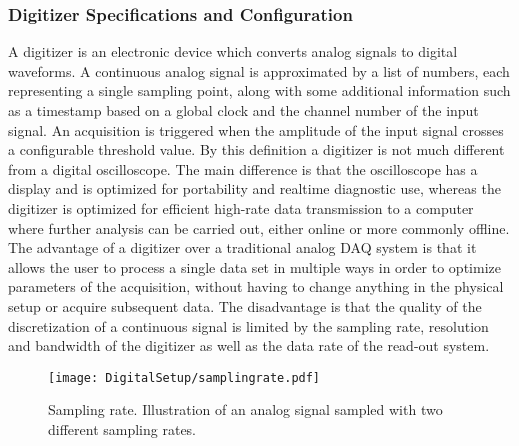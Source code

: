 \documentclass[main.tex]{subfiles}
\begin{document}
\subsubsection{Digitizer Specifications and Configuration}
A digitizer is an electronic device which converts analog signals to digital waveforms. A continuous analog signal is approximated by a list of numbers, each representing a single sampling point, along with some additional information such as a timestamp based on a global clock and the channel number of the input signal. An acquisition is triggered when the amplitude of the input signal crosses a configurable threshold value.
By this definition a digitizer is not much different from a digital oscilloscope. The main difference is that the oscilloscope has a display and is optimized for portability and realtime diagnostic use, whereas the digitizer is optimized for efficient high-rate data transmission to a computer where further analysis can be carried out, either online or more commonly offline.
The advantage of a digitizer over a traditional analog DAQ system is that it allows the user to process a single data set in multiple ways in order to optimize parameters of the acquisition, without having to change anything in the physical setup or acquire subsequent data. The disadvantage is that the quality of the discretization of a continuous signal is limited by the sampling rate, resolution and bandwidth of the digitizer as well as the data rate of the read-out system.

\begin{figure}[ht]
	\centering
    	\texttt{[image: DigitalSetup/samplingrate.pdf]}
        \caption[Sampling rate.]{Sampling rate. Illustration of an analog signal sampled with two different sampling rates.}
	    \label{fig:samplingrate} 
\end{figure}
\end{document}
